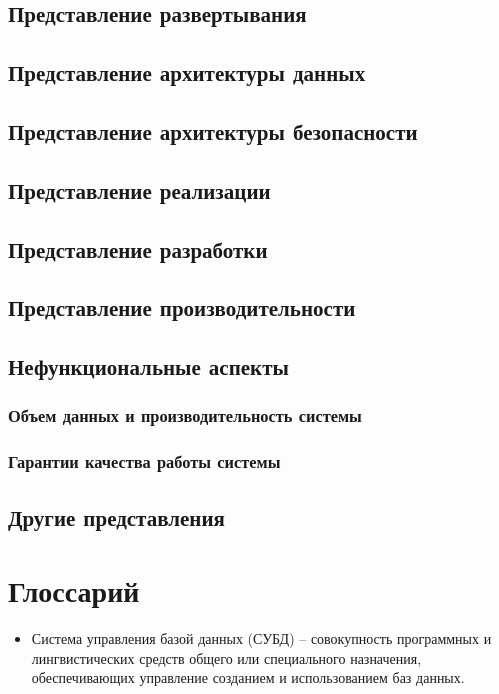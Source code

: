 \documentclass[a4paper,18pt]{article} %
\begin{document}
\subsection{\textbf{Представление развертывания}}

\subsection{\textbf{Представление архитектуры данных}}

\subsection{\textbf{Представление архитектуры безопасности}}

\subsection{\textbf{Представление реализации}}

\subsection{\textbf{Представление разработки}}

\subsection{\textbf{Представление производительности}}

\subsection{\textbf{Нефункциональные аспекты}}
\subsubsection{\textbf{Объем данных и производительность системы}}
\subsubsection{\textbf{Гарантии качества работы системы}}

\subsection{\textbf{Другие представления}}


\newpage

\section*{Глоссарий}
\begin{itemize}
    \item Система управления базой данных (СУБД) -- совокупность программных и лингвистических средств общего или специального назначения, обеспечивающих управление созданием и использованием баз данных.
\end{itemize}

                                   

\end{document}
